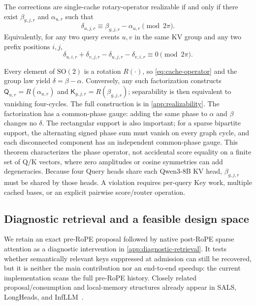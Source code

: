 \begin{theorem}
\label{thm:cache-realizability}
The corrections are single-cache rotary-operator realizable if and only if
there exist $\beta_{g,j,r}$ and $\alpha_{u,r}$ such that
\begin{equation}
  \delta_{u,j,r}\equiv\beta_{g,j,r}-\alpha_{u,r}\pmod{2\pi}.
  \label{eq:separable-phase}
\end{equation}
Equivalently, for any two query events $u,v$ in the same KV group and any two
prefix positions $i,j$,
\begin{equation}
  \delta_{u,i,r}+\delta_{v,j,r}
  -\delta_{u,j,r}-\delta_{v,i,r}\equiv0\pmod{2\pi}.
  \label{eq:four-cycle}
\end{equation}
\end{theorem}

Every element of $\mathrm{SO}(2)$ is a rotation $R(\cdot)$, so
\cref{eq:cache-operator} and the group law yield $\delta=\beta-\alpha$.
Conversely, any such factorization constructs
$\mathsf Q_{u,r}=R(\alpha_{u,r})$ and
$\mathsf K_{g,j,r}=R(\beta_{g,j,r})$; separability is then equivalent to
vanishing four-cycles.
The full construction is in \cref{app:realizability}.  The factorization has a
common-phase gauge: adding the same phase to $\alpha$ and $\beta$ changes no
$\delta$.  The rectangular support is also important; for a sparse bipartite
support, the alternating signed phase sum must vanish on every graph cycle, and
each disconnected component has an independent common-phase gauge.
This theorem characterizes the phase operator, not accidental score equality on
a finite set of Q/K vectors, where zero amplitudes or cosine symmetries can add
degeneracies.  Because four Query heads share each Qwen3-8B KV head,
$\beta_{g,j,r}$ must be shared by those heads.  A violation requires per-query
Key work, multiple cached bases, or an explicit pairwise score/router operation.

\subsection{Diagnostic retrieval and a feasible design space}

We retain an exact pre-RoPE proposal followed by native post-RoPE sparse
attention as a diagnostic intervention in \cref{app:diagnostic-retrieval}.  It
tests whether semantically relevant keys suppressed at admission can still be
recovered, but it is neither the main contribution nor an end-to-end speedup:
the current implementation scans the full pre-RoPE history.  Closely related
proposal/consumption and local-memory structures already appear in SALS,
LongHeads, and InfLLM~\citep{mu2025sals,lu2024longheads,xiao2024infllm}.

